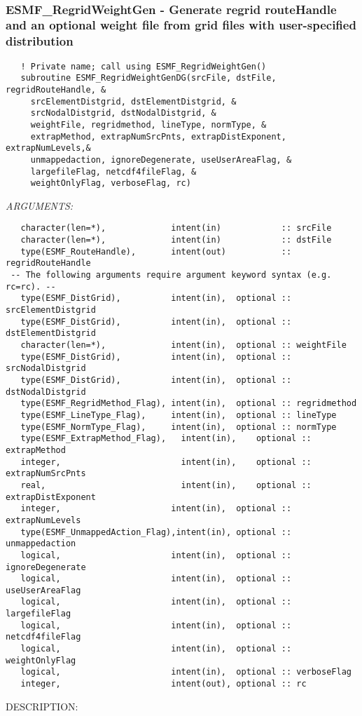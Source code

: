 \mbox{}\hrulefill\ 
 
\subsubsection [ESMF\_RegridWeightGen] {ESMF\_RegridWeightGen - Generate regrid routeHandle and an optional weight file from grid files with user-specified distribution}


   \label{api:esmf_regridweightgenDG}
\begin{verbatim}   ! Private name; call using ESMF_RegridWeightGen()
   subroutine ESMF_RegridWeightGenDG(srcFile, dstFile, regridRouteHandle, &
     srcElementDistgrid, dstElementDistgrid, &
     srcNodalDistgrid, dstNodalDistgrid, &
     weightFile, regridmethod, lineType, normType, &
     extrapMethod, extrapNumSrcPnts, extrapDistExponent, extrapNumLevels,&
     unmappedaction, ignoreDegenerate, useUserAreaFlag, &
     largefileFlag, netcdf4fileFlag, &
     weightOnlyFlag, verboseFlag, rc)
 \end{verbatim}{\em ARGUMENTS:}
\begin{verbatim} 
   character(len=*),             intent(in)            :: srcFile
   character(len=*),             intent(in)            :: dstFile
   type(ESMF_RouteHandle),       intent(out)           :: regridRouteHandle
 -- The following arguments require argument keyword syntax (e.g. rc=rc). --
   type(ESMF_DistGrid),          intent(in),  optional :: srcElementDistgrid
   type(ESMF_DistGrid),          intent(in),  optional :: dstElementDistgrid
   character(len=*),             intent(in),  optional :: weightFile
   type(ESMF_DistGrid),          intent(in),  optional :: srcNodalDistgrid
   type(ESMF_DistGrid),          intent(in),  optional :: dstNodalDistgrid
   type(ESMF_RegridMethod_Flag), intent(in),  optional :: regridmethod
   type(ESMF_LineType_Flag),     intent(in),  optional :: lineType
   type(ESMF_NormType_Flag),     intent(in),  optional :: normType
   type(ESMF_ExtrapMethod_Flag),   intent(in),    optional :: extrapMethod
   integer,                        intent(in),    optional :: extrapNumSrcPnts
   real,                           intent(in),    optional :: extrapDistExponent
   integer,                      intent(in),  optional :: extrapNumLevels
   type(ESMF_UnmappedAction_Flag),intent(in), optional :: unmappedaction
   logical,                      intent(in),  optional :: ignoreDegenerate
   logical,                      intent(in),  optional :: useUserAreaFlag
   logical,                      intent(in),  optional :: largefileFlag
   logical,                      intent(in),  optional :: netcdf4fileFlag
   logical,                      intent(in),  optional :: weightOnlyFlag
   logical,                      intent(in),  optional :: verboseFlag
   integer,                      intent(out), optional :: rc
 \end{verbatim}
{\sf DESCRIPTION:\\ }


